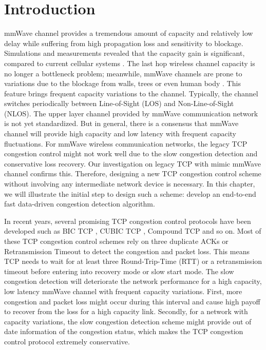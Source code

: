 \section{Introduction}
\par  mmWave channel provides a tremendous amount of capacity and relatively low delay while suffering from high propagation loss and sensitivity to blockage. Simulations and measurements revealed that the capacity gain is significant, compared to current cellular systems \cite{akdeniz2014millimeter,bai2015coverage}. The last hop wireless channel capacity is no longer a bottleneck problem; meanwhile, mmWave channels are prone to variations due to the blockage from walls, trees or even human body \cite{lu2012modeling, zhao201328, alejos2008measurement}. This feature brings frequent capacity variations to the channel. Typically, the channel switches periodically between Line-of-Sight (LOS) and Non-Line-of-Sight (NLOS). The upper layer channel provided by mmWave communication network is not yet standardized. But in general, there is a consensus that mmWave channel will provide high capacity and low latency with frequent capacity fluctuations. For mmWave wireless communication networks, the legacy TCP congestion control might not work well due to the slow congestion detection and conservative loss recovery. Our investigation on legacy TCP with mimic mmWave channel confirms this. Therefore, designing a new TCP congestion control scheme without involving any intermediate network device is necessary. In this chapter, we will illustrate the initial step to design such a scheme: develop an end-to-end fast data-driven congestion detection algorithm.
\par In recent years, several promising TCP congestion control protocols have been developed such as BIC TCP \cite{xu2004binary}, CUBIC TCP \cite{ha2008cubic}, Compound TCP \cite{tan2006compound} and so on. Most of these TCP congestion control schemes rely on three duplicate ACKs or Retransmission Timeout to detect the congestion and packet loss. This means TCP needs to wait for at least three Round-Trip-Time (RTT) or a retransmission timeout before entering into recovery mode or slow start mode. The slow congestion detection will deteriorate the network performance for a high capacity, low latency mmWave channel with frequent capacity variations. First, more congestion and packet loss might occur during this interval and cause high payoff to recover from the loss for a high capacity link. Secondly, for a network with capacity variations, the slow congestion detection scheme might provide out of date information of the congestion status, which makes the TCP congestion control protocol extremely conservative.
